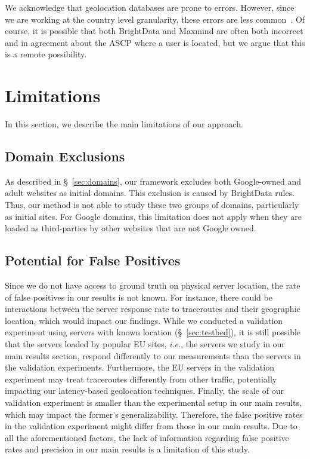 We acknowledge that geolocation databases are prone to errors. However,
since we are working at the country level granularity, 
these errors are less common~\cite{10.1007/978-3-030-98785-5_6,10.1145/1971162.1971171}.
Of course, it is possible that both BrightData and Maxmind are often both incorrect and in agreement about
the ASCP where a user is located, but we argue that this is a remote possibility.

\section{Limitations}
In this section, we describe the main limitations of our approach. 

\subsection{Domain Exclusions}
\label{sec:domexc}
As described in \S~\ref{sec:domains}, our framework excludes
both Google-owned and adult websites as initial domains.
This exclusion is caused by BrightData rules. Thus,
our method is not able to study
these two groups of domains, particularly as
initial sites. For Google domains, this limitation
does not apply when they are loaded as third-parties by
other websites that are not Google owned.

\subsection{Potential for False Positives}
\label{sec:falsepos}
Since we do not have access to ground truth 
on physical server location, the rate of false positives in our
results is not known. 
For instance, there could be interactions between the 
server response rate to traceroutes and their geographic
location, which would impact our findings.
While we conducted a validation experiment
using servers with known location (\S~\ref{sec:testbed}),
it is still possible that the servers loaded by popular EU sites,
\textit{i.e.}, the servers we study in our main results section,
respond differently to our measurements than the servers in the
validation experiments. Furthermore, 
the EU servers in the validation experiment may treat 
traceroutes differently from other traffic,
potentially impacting our latency-based geolocation techniques.
Finally, the scale of our validation experiment is smaller than
the experimental setup in our main results,
which may impact the former's generalizability.
Therefore, the false positive rates in the validation 
experiment %
might differ from those in our main results.
Due to all the aforementioned factors, 
the lack of information regarding false positive rates and
precision in our main results is a limitation of this study.



